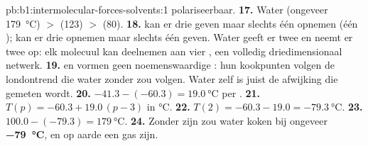 \begin{solution}{pb:b1:intermolecular-forces-solvents:1}
polariseerbaar.
\textbf{17.} Water (ongeveer \qty{179}{\celsius}) $>$  (123) $>$
 (80).
\textbf{18.}  kan er drie geven maar slechts één opnemen (één
);  kan er drie opnemen maar slechts één geven. Water
geeft er twee en neemt er twee op: elk molecuul kan deelnemen aan vier
, een volledig driedimensionaal netwerk.
\textbf{19.}  en  vormen geen noemenswaardige
: hun kookpunten volgen de londontrend die water zonder
 zou volgen. Water zelf is juist de afwijking die gemeten
wordt.
\textbf{20.} $-41.3 - (-60.3) = \qty{19.0}{\celsius}$ per .
\textbf{21.} $T(p) = -60.3 + 19.0\,(p - 3)$ in \unit{\celsius}.
\textbf{22.} $T(2) = -60.3 - 19.0 = \qty{-79.3}{\celsius}$.
\textbf{23.} $100.0 - (-79.3) = \qty{179}{\celsius}$.
\textbf{24.} Zonder zijn  zou water koken bij ongeveer
\textbf{\qty{-79}{\celsius}}, en op aarde een gas zijn.
\end{solution}
